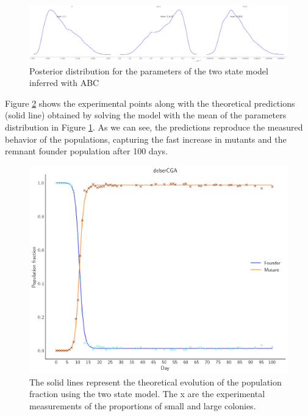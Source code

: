 \documentclass[10pt,a4paper]{scrartcl}
\begin{document}
\begin{figure}[H]
	\centering
    \includegraphics[scale=0.3]{plots/abc_2st_posterior.png}
    \caption{Posterior distribution for the parameters of the two state model inferred with ABC}
    \label{fig:abc_2st_posterior}
\end{figure}
Figure \ref{fig:2st_abc_fit} shows the experimental points along with the theoretical predictions (solid line) obtained by solving the model with the mean of the parameters distribution in Figure \ref{fig:abc_2st_posterior}. %
As we can see, the predictions reproduce the measured behavior of the populations, capturing the fast increase in mutants and the remnant founder population after 100 days.

\begin{figure}[H]
	\centering
    \includegraphics[scale=0.4]{plots/2st_abc_fit.png}
    \caption{The solid lines represent the theoretical evolution of the population fraction using the two state model. The x are the experimental measurements of the proportions of small and large colonies.}%
    \label{fig:2st_abc_fit}
\end{figure}
\end{document}
